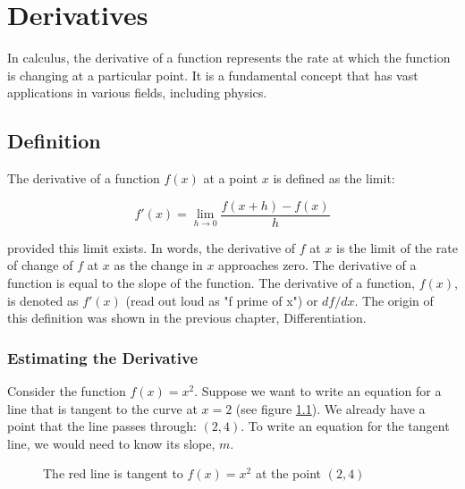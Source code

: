 \chapter{Derivatives}

In calculus, the derivative of a function represents the rate at which the 
function is changing at a particular point. It is a fundamental concept that 
has vast applications in various fields, including physics.

\section{Definition}

The derivative of a function $f(x)$ at a point $x$ is defined as the limit:

\begin{equation}
f'(x) = \lim_{{h \to 0}} \frac{f(x+h) - f(x)}{h}
\end{equation}

provided this limit exists. In words, the derivative of $f$ at $x$ is the 
limit of the rate of change of $f$ at $x$ as the change in $x$ approaches zero. 
The derivative of a function is equal to the slope  of the function. The 
derivative of a function, $f(x)$, is denoted as $f'(x)$ (read out loud as "f 
prime of x") or $df/dx$. The origin of this definition was shown in the 
previous chapter, Differentiation. 


\subsection{Estimating the Derivative}
Consider the function $f(x) = x^2$. Suppose we want to write an equation for a 
line that is tangent to the curve at $x = 2$ (see figure \ref{fig:tangent}). 
We already have a point that the line passes through: $(2, 4)$. To write an 
equation for the tangent line, we would need to know its slope, $m$. 

\begin{figure}[htbp]
    \centering
    \caption{The red line is tangent to $f(x) = x^2$ at the point $(2, 4)$}
    \label{fig:tangent}
\end{figure}


